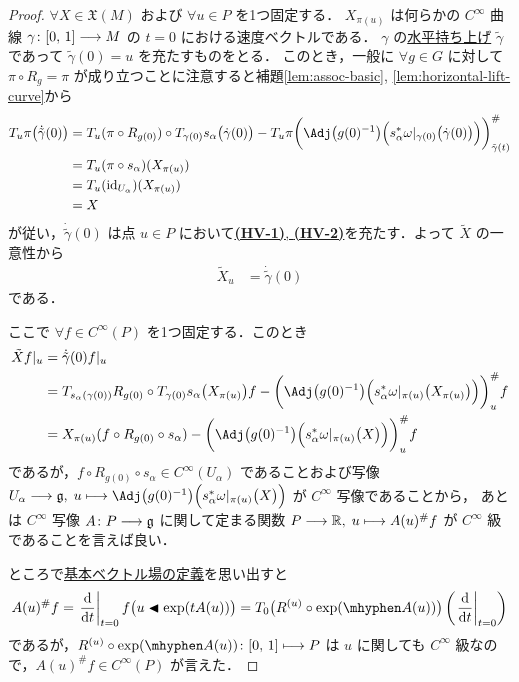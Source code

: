 \documentclass[geometry_main]{subfiles}
\begin{document}
\begin{proof}
    $\forall X \in \mathfrak{X}(M)$ および $\forall u \in P$ を1つ固定する．
    $X_{\pi(u)}$ は何らかの $C^\infty$ 曲線 $\gamma \colon [0,\, 1] \longrightarrow M$ の $t=0$ における速度ベクトルである．
    $\gamma$ の\hyperref[def:horizontal-lift-curve]{水平持ち上げ} $\tilde{\gamma}$ であって $\tilde{\gamma} (0) = u$ を充たすものをとる．
    このとき，一般に $\forall g \in G$ に対して $\pi \circ R_g = \pi$  が成り立つことに注意すると補題\ref{lem:assoc-basic}, \ref{lem:horizontal-lift-curve}から
    \begin{align}
        T_u \pi \bigl(\dot{\tilde{\gamma}} (0)\bigr)
        &= T_{u} (\pi \circ R_{g(0)}) \circ T_{\gamma(0)} s_\alpha \bigl( \dot{\gamma}(0) \bigr) - T_u \pi \biggl(\Adj \bigl( g(0)^{-1} \bigr) \Bigl( s_\alpha^* \omega|_{\gamma(0)}\bigl(\dot{\gamma}(0)\bigr) \Bigr) \biggr)^\#_{\tilde{\gamma}(t)} \\
        &= T_u (\pi \circ s_\alpha) (X_{\pi(u)}) \\
        &= T_u (\mathrm{id}_{U_\alpha}) (X_{\pi(u)}) \\
        &= X
    \end{align}
    が従い，$\dot{\tilde{\gamma}}(0)$ は点 $u \in P$ において\hyperref[def:horizontal-lift-vecf]{\textbf{\textsf{(HV-1)}}, \textsf{\textbf{(HV-2)}}}を充たす．よって $\tilde{X}$ の一意性から
    \begin{align}
        \tilde{X}_{u} 
        &= \dot{\tilde{\gamma}}(0)
    \end{align}
    である．

    ここで $\forall f \in C^\infty (P)$ を1つ固定する．このとき
    \begin{align}
        \tilde{X} f|_u
        &= \dot{\tilde{\gamma}}(0) f|_u \\
        &= T_{s_\alpha(\gamma(0))} R_{g(0)} \circ T_{\gamma(0)} s_\alpha \bigl( X_{\pi(u)} \bigr) f - \biggl(\Adj \bigl( g(0)^{-1} \bigr) \Bigl( s_\alpha^* \omega|_{\pi(u)}\bigl(X_{\pi(u)}\bigr) \Bigr) \biggr)^\#_{u} f \\
        &= X_{\pi(u)} (f \circ R_{g(0)} \circ s_\alpha) - \biggl(\Adj \bigl( g(0)^{-1} \bigr) \Bigl( s_\alpha^* \omega|_{\pi(u)}\bigl(X\bigr) \Bigr) \biggr)^\#_{u} f
    \end{align}
    であるが，$f \circ R_{g(0)} \circ s_\alpha \in C^\infty(U_\alpha)$ であることおよび写像 $U_\alpha \lto \mathfrak{g},\;  u \lmto \Adj \bigl( g(0)^{-1} \bigr) \Bigl( s_\alpha^* \omega|_{\pi(u)}\bigl(X\bigr) \Bigr)$ が $C^\infty$ 写像であることから，
    あとは $C^\infty$ 写像 $A \colon P \longrightarrow \mathfrak{g}$ に関して定まる関数 $P \longrightarrow \mathbb{R},\; u \longmapsto A(u)^\# f$ が $C^\infty$ 級であることを言えば良い．
    
    ところで\hyperref[def:fundamental-vecf]{基本ベクトル場の定義}を思い出すと
    \begin{align}
        A(u)^\# f = \eval{\dv{}{t}}_{t=0} f \bigl( u \btl \exp(t A(u)) \bigr) = T_{0} \bigl( R^{(u)} \circ \exp (\mhyphen A(u)) \bigr) \left( \eval{\dv{}{t}}_{t=0} \right) 
    \end{align}
    であるが，$R^{(u)} \circ \exp (\mhyphen A(u)) \colon [0,\, 1] \lmto P$ は $u$ に関しても $C^\infty$ 級なので，$A(u)^\# f \in C^\infty (P)$ が言えた．
\end{proof}
\end{document}
